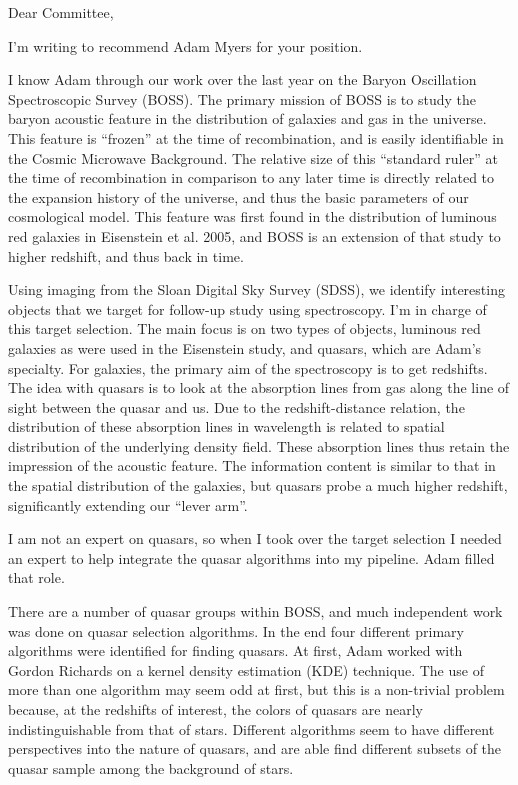 \documentclass[12pt]{letter}
\begin{document}
\begin{letter}{}

\opening{Dear Committee,}

I'm writing to recommend Adam Myers for your position.  

I know Adam through our work over the last year on the Baryon Oscillation
Spectroscopic Survey (BOSS).  The primary mission of BOSS is to study the
baryon acoustic feature in the distribution of galaxies and gas in the
universe.  This feature is ``frozen'' at the time of recombination, and is
easily identifiable in the Cosmic Microwave Background.  The relative size of
this ``standard ruler'' at the time of recombination in comparison to any later
time is directly related to the expansion history of the universe, and thus the
basic parameters of our cosmological model.  This feature was first found in
the distribution of luminous red galaxies in Eisenstein et al. 2005, and BOSS
is an extension of that study to higher redshift, and thus back in time.

Using imaging from the Sloan Digital Sky Survey (SDSS), we identify interesting
objects that we target for follow-up study using spectroscopy.  I'm in charge
of this target selection.  The main focus is on two types of objects, luminous
red galaxies as were used in the Eisenstein study, and quasars, which are
Adam's specialty.  For galaxies, the primary aim of the spectroscopy is to get
redshifts.  The idea with quasars is to look at the absorption lines from gas
along the line of sight between the quasar and us.  Due to the
redshift-distance relation, the distribution of these absorption lines in
wavelength is related to spatial distribution of the underlying density field.
These absorption lines thus retain the impression of the acoustic feature.  The
information content is similar to that in the spatial distribution of the
galaxies, but quasars probe a much higher redshift, significantly extending our
``lever arm''.

I am not an expert on quasars, so when I took over the target selection I
needed an expert to help integrate the quasar algorithms into my pipeline.
Adam filled that role.  

There are a number of quasar groups within BOSS, and much independent work was
done on quasar selection algorithms.  In the end four different primary
algorithms were identified for finding quasars.  At first, Adam worked with
Gordon Richards on a kernel density estimation (KDE) technique.  The use of
more than one algorithm may seem odd at first, but this is a non-trivial
problem because, at the redshifts of interest, the colors of quasars are nearly
indistinguishable from that of stars.  Different algorithms seem to have
different perspectives into the nature of quasars, and are able find different
subsets of the quasar sample among the background of stars.  


\end{letter}
\end{document}
